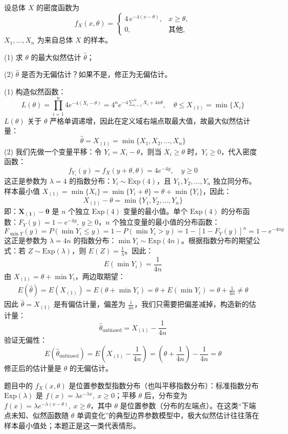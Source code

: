 ﻿\documentclass[lang=cn,11pt]{elegantbook}
\begin{document}
\begin{exercise}\label{exer:7-exp4-shift}
设总体 \(X\) 的密度函数为
\[
f_X(x,\theta) = \begin{cases} 4\,e^{-4(x-\theta)}, & x \geq \theta, \\ 0, & \text{其他}, \end{cases}
\]
\(X_1, \dots, X_n\) 为来自总体 \(X\) 的样本。\par
(1) 求 \(\theta\) 的最大似然估计 \(\hat{\theta}\)；\par
(2) \(\hat{\theta}\) 是否为无偏估计？如果不是，修正为无偏估计。
\end{exercise}
\begin{solution}
(1) 构造似然函数：
$$L(\theta) = \prod_{i=1}^n 4 e^{-4(X_i-\theta)} = 4^n e^{-4\sum_{i=1}^n X_i + 4n\theta}, \quad \theta \leq X_{(1)} = \min\{X_i\}$$
$L(\theta)$ 关于 $\theta$ 严格单调递增，因此在定义域右端点取最大值，故最大似然估计量：
$$\hat{\theta} = X_{(1)} = \min\{X_1,X_2,\dots,X_n\}$$
(2) 我们先做一个变量平移：令 $Y_i = X_i - \theta$，则当 $X_i \geq \theta$ 时，$Y_i \geq 0$，代入密度函数：
  $$  f_{Y_i}(y) = f_X(y+\theta,\theta) = 4 e^{-4y}, \quad y \geq 0  $$
  这正是参数为 $\lambda=4$ 的指数分布：$Y_i \sim \text{Exp}(4)$，且 $Y_1,Y_2,\dots,Y_n$ 独立同分布。
样本最小值 $X_{(1)} = \min\{X_i\} = \min\{Y_i+\theta\} = \theta + \min\{Y_i\}$，因此：
  $$  X_{(1)} - \theta = \min\{Y_1,Y_2,\dots,Y_n\}  $$
  即：$\boldsymbol{X_{(1)} - \theta}$ 是 $n$ 个独立 $\text{Exp}(4)$ 变量的最小值。单个 $\text{Exp}(4)$ 的分布函数：$F_Y(y) = 1 - e^{-4y},\ y\geq0$，$n$ 个独立变量的最小值的分布函数：
  $$  F_{\min Y}(y) = P(\min Y_i \leq y) = 1 - P(\min Y_i > y) = 1 - [1-F_Y(y)]^n = 1 - e^{-4ny}  $$
  这正是参数为 $\lambda=4n$ 的指数分布：$\min Y_i \sim \text{Exp}(4n)$。根据指数分布的期望公式：若 $Z \sim \text{Exp}(\lambda)$，则 $E(Z) = \frac{1}{\lambda}$。因此：
  $$  E\left(\min Y_i\right) = \frac{1}{4n}  $$
由 $X_{(1)} = \theta + \min Y_i$，两边取期望：
\begin{align*}
E(\hat{\theta}) = E(X_{(1)}) = E\left(\theta + \min Y_i\right) = \theta + E\left(\min Y_i\right) = \theta + \frac{1}{4n}\neq \theta
\end{align*}
因此 $\hat{\theta} = X_{(1)}$ 是有偏估计量，偏差为 $\frac{1}{4n}$，我们只需要把偏差减掉，构造新的估计量：
$$
\hat{\theta}_{\text{unbiased}} = X_{(1)} - \frac{1}{4n}
$$
验证无偏性：
$$
E\left(\hat{\theta}_{\text{unbiased}}\right) = E\left(X_{(1)} - \frac{1}{4n}\right) = \left(\theta + \frac{1}{4n}\right) - \frac{1}{4n} = \theta
$$
修正后的估计量是 $\theta$ 的无偏估计。
\end{solution}
\begin{note}
题目中的 $f_X(x,\theta)$ 是位置参数型指数分布（也叫平移指数分布）：标准指数分布 $\text{Exp}(\lambda)$ 是 $f(x) = \lambda e^{-\lambda x},\ x\geq0$；平移 $\theta$ 后，分布变为 $f(x) = \lambda e^{-\lambda(x-\theta)},\ x\geq\theta$，其中 $\theta$ 是位置参数（分布的左端点）。在这类“下端点未知、似然函数随 \(\theta\) 单调变化”的典型边界参数模型中，极大似然估计往往落在样本最小值处；本题正是这一类代表情形。
\end{note}
\end{document}

